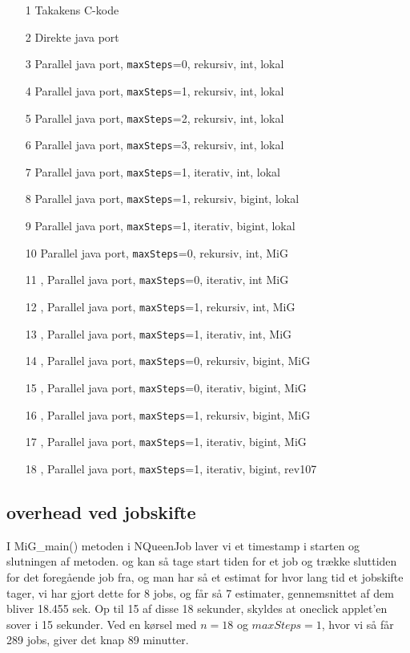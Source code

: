 \begin{itemize}
\item[1] Takakens C-kode
\item[2] Direkte java port
\item[3] Parallel java port, \texttt{maxSteps}=0, rekursiv, int, lokal
\item[4] Parallel java port, \texttt{maxSteps}=1, rekursiv, int, lokal
\item[5] Parallel java port, \texttt{maxSteps}=2, rekursiv, int, lokal
\item[6] Parallel java port, \texttt{maxSteps}=3, rekursiv, int, lokal
\item[7] Parallel java port, \texttt{maxSteps}=1, iterativ, int, lokal
\item[8] Parallel java port, \texttt{maxSteps}=1, rekursiv, bigint, lokal
\item[9] Parallel java port, \texttt{maxSteps}=1, iterativ, bigint, lokal
\item[10] Parallel java port, \texttt{maxSteps}=0, rekursiv, int, MiG
\item[11], Parallel java port, \texttt{maxSteps}=0, iterativ, int MiG
\item[12], Parallel java port, \texttt{maxSteps}=1, rekursiv, int, MiG
\item[13], Parallel java port, \texttt{maxSteps}=1, iterativ, int, MiG
\item[14], Parallel java port, \texttt{maxSteps}=0, rekursiv, bigint, MiG
\item[15], Parallel java port, \texttt{maxSteps}=0, iterativ, bigint, MiG
\item[16], Parallel java port, \texttt{maxSteps}=1, rekursiv, bigint, MiG
\item[17], Parallel java port, \texttt{maxSteps}=1, iterativ, bigint, MiG
\item[18], Parallel java port, \texttt{maxSteps}=1, iterativ, bigint, rev107 
\end{itemize}

\subsection{overhead ved jobskifte}

I MiG\_main() metoden i NQueenJob laver vi et timestamp i starten og slutningen af metoden. 
og kan så tage start tiden for et job og trække sluttiden for det foregående job
fra, og man har så et estimat for hvor lang tid et jobskifte tager, vi har gjort
dette for 8 jobs, og får så 7 estimater, gennemsnittet af dem bliver 18.455 sek. 
Op til 15 af disse 18 sekunder, skyldes at oneclick applet'en sover i 15 sekunder. 
Ved en kørsel med $n=18$ og $maxSteps=1$, hvor vi så får 289 jobs, giver det
knap 89 minutter. 

